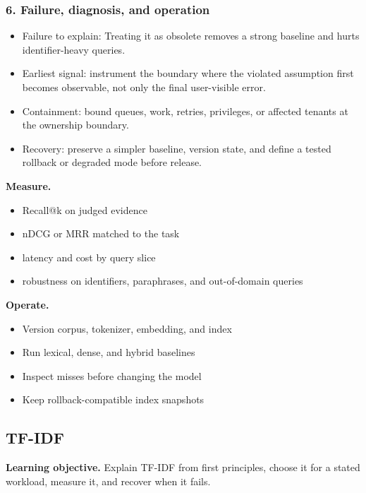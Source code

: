 \subsubsection*{6. Failure, diagnosis, and operation}
\begin{itemize}
\item Failure to explain: Treating it as obsolete removes a strong baseline and hurts identifier-heavy queries.
\item Earliest signal: instrument the boundary where the violated assumption first becomes observable, not only the final user-visible error.
\item Containment: bound queues, work, retries, privileges, or affected tenants at the ownership boundary.
\item Recovery: preserve a simpler baseline, version state, and define a tested rollback or degraded mode before release.
\end{itemize}
\textbf{Measure.}\begin{itemize}
\item Recall@k on judged evidence
\item nDCG or MRR matched to the task
\item latency and cost by query slice
\item robustness on identifiers, paraphrases, and out-of-domain queries
\end{itemize}
\textbf{Operate.}\begin{itemize}
\item Version corpus, tokenizer, embedding, and index
\item Run lexical, dense, and hybrid baselines
\item Inspect misses before changing the model
\item Keep rollback-compatible index snapshots
\end{itemize}
\subsection{TF-IDF}
\textbf{Learning objective.} Explain TF-IDF from first principles, choose it for a stated workload, measure it, and recover when it fails.
